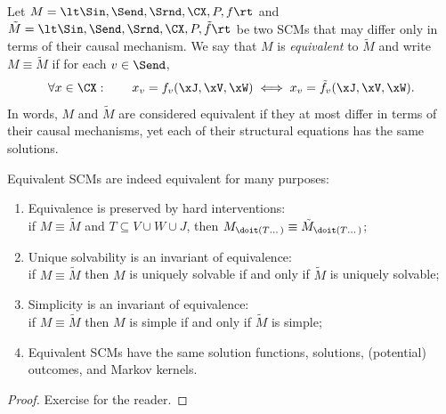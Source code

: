 \begin{Def}
  Let $M = \lt \Sin, \Send, \Srnd, \CX, P, f \rt$ and
  $\tilde{M} = \lt \Sin, \Send, \Srnd, \CX, P, \tilde{f} \rt$ be two SCMs that may
  differ only in terms of their causal mechanism. We say that
  $M$ is \emph{equivalent} to $\tilde{M}$ and write $M \equiv \tilde{M}$ if for each $v \in \Send$,
  $$\forall x \in \CX: \qquad x_v = f_v(\xJ,\xV,\xW) \iff x_v = \tilde{f}_v(\xJ,\xV,\xW).$$
  In words, $M$ and $\tilde{M}$ are considered equivalent if they at most differ in terms of their
  causal mechanisms, yet each of their structural equations has the same solutions.
\end{Def}
Equivalent SCMs are indeed equivalent for many purposes:
\begin{Prp}
\begin{enumerate}
  \item Equivalence is preserved by hard interventions:\\
    if $M \equiv \tilde{M}$ and $T \subseteq V \cup W \cup J$, then $M_{\doit(T\dots)} \equiv \tilde{M}_{\doit(T\dots)}$;
  \item Unique solvability is an invariant of equivalence:\\
    if $M \equiv \tilde{M}$ then $M$ is uniquely solvable if and only if $\tilde{M}$ is uniquely solvable;
  \item Simplicity is an invariant of equivalence:\\
    if $M \equiv \tilde{M}$ then $M$ is simple if and only if $\tilde{M}$ is simple;
  \item Equivalent SCMs have the same solution functions, solutions, (potential) outcomes, and Markov kernels.
\end{enumerate}
\end{Prp}
\begin{proof}
  Exercise for the reader.
\end{proof}

